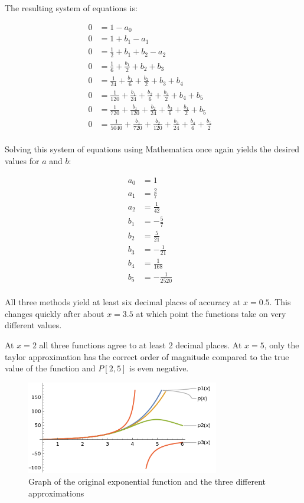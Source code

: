 \documentclass[12pt]{article}
\begin{document}
The resulting system of equations is:

\begin{align*}
	0 & = 1 - a_{0} &\\
	0 & = 1 + b_{1} - a_{1} &\\
	0 & =  \frac{1}{2} + b_{1} + b_{2}  - a_{2} &\\
	0 & =  \frac{1}{6} + \frac{b_{1}}{2} + b_{2} + b_{3} &\\
	0 & =  \frac{1}{24} + \frac{b_{1}}{6} + \frac{b_{2}}{2} + b_{3} + b_{4} &\\
	0 & =  \frac{1}{120} + \frac{b_{1}}{24} + \frac{b_{2}}{6} + \frac{b_{3}}{2} + b_{4} + b_{5} &\\
	0 & =  \frac{1}{720} + \frac{b_{1}}{120} + \frac{b_{2}}{24} + \frac{b_{3}}{6} + \frac{b_{4}}{2} + b_{5} &\\
	0 & =  \frac{1}{5040} + \frac{b_{1}}{720} + \frac{b_{2}}{120} + \frac{b_{3}}{24} + \frac{b_{4}}{6} + \frac{b_{5}}{2} &\\
\end{align*}

Solving this system of equations using Mathematica once again yields the desired values for \(a\) and \(b\):

\begin{align*}
	a_{0} & =  1 &\\
	a_{1} & =  \frac{2}{7} &\\
	a_{2} & =  \frac{1}{42} &\\
	b_{1} & =  - \frac{5}{7} &\\
	b_{2} & =  \frac{5}{21} &\\
	b_{3} & =  - \frac{1}{21} &\\
	b_{4} & =  \frac{1}{168} &\\
	b_{5} & =  - \frac{1}{2520} &\\
\end{align*}

All three methods yield at least six decimal places of accuracy at \(x = 0.5\). This changes quickly after about \(x = 3.5\) at which point the functions take on very different values. 

At \(x = 2\) all three functions agree to at least 2 decimal places. At \(x = 5\), only the taylor approximation has the correct order of magnitude compared to the true value of the function and \(P[2,5]\) is even negative. 

     \begin{figure}[ht]
    \centering
    \includegraphics[width=0.75\textwidth]{graph_prob1.png}
    \caption{Graph of the original exponential function and the three different approximations}
    \label{fig:graph1}
\end{figure}
\end{document}

